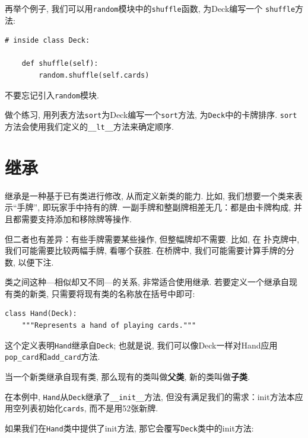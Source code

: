 \documentclass[10pt]{book}
\begin{document}
再举个例子, 我们可以用{\tt random}模块中的{\tt shuffle}函数, 为Deck编写一个
{\tt shuffle}方法:

\begin{verbatim}
# inside class Deck:
            
    def shuffle(self):
        random.shuffle(self.cards)
\end{verbatim}
%
不要忘记引入{\tt random}模块.

做个练习, 用列表方法{\tt sort}为Deck编写一个{\tt sort}方法, 
为{\tt Deck}中的卡牌排序. 
{\tt sort}方法会使用我们定义的\verb"__lt__"方法来确定顺序. 
 



\section{继承}

继承是一种基于已有类进行修改, 从而定义新类的能力. 
比如, 我们想要一个类来表示``手牌'', 即玩家手中持有的牌. 
一副手牌和整副牌相差无几：都是由卡牌构成, 并且都需要支持添加和移除牌等操作. 

但二者也有差异：有些手牌需要某些操作, 但整幅牌却不需要. 比如, 在
扑克牌中, 我们可能需要比较两幅手牌, 看哪个获胜. 
在桥牌中, 我们可能需要计算手牌的分数, 以便下注. 

类之间这种---相似却又不同---的关系, 非常适合使用继承. 
若要定义一个继承自现有类的新类, 只需要将现有类的名称放在括号中即可:

\begin{verbatim}
class Hand(Deck):
    """Represents a hand of playing cards."""
\end{verbatim}
%
这个定义表明{\tt Hand}继承自{\tt Deck};
也就是说, 我们可以像Deck一样对Hand应用\verb"pop_card"和\verb"add_card"方法.

当一个新类继承自现有类, 那么现有的类叫做{\bf 父类}, 
新的类叫做{\bf 子类}.

在本例中, {\tt Hand}从{\tt Deck}继承了\verb"__init__"方法, 
但没有满足我们的需求：init方法本应用空列表初始化{\tt cards}, 
而不是用52张新牌. 
 

如果我们在{\tt Hand}类中提供了init方法, 那它会覆写{\tt Deck}类中的init方法:
\end{document}
